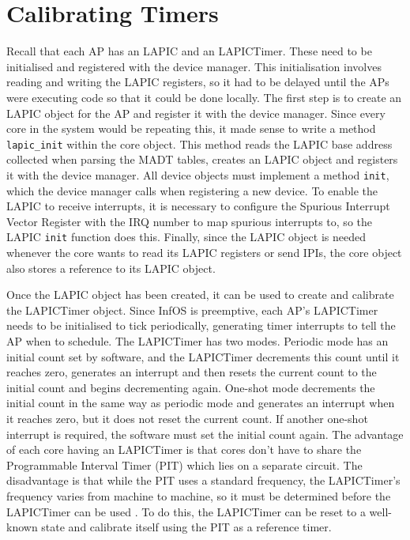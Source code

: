 \documentclass[bsc,frontabs,singlespacing,parskip,deptreport]{infthesis}
\begin{document}
\section{Calibrating Timers} \label{calibrating-timers}
Recall that each AP has an LAPIC and an LAPICTimer. These need to be initialised and registered with the device manager. This initialisation involves reading and writing the LAPIC registers, so it had to be delayed until the APs were executing code so that it could be done locally. The first step is to create an LAPIC object for the AP and register it with the device manager. Since every core in the system would be repeating this, it made sense to write a method \verb|lapic_init| within the core object. This method reads the LAPIC base address collected when parsing the MADT tables, creates an LAPIC object and registers it with the device manager. All device objects must implement a method \verb|init|, which the device manager calls when registering a new device. To enable the LAPIC to receive interrupts, it is necessary to configure the Spurious Interrupt Vector Register with the IRQ number to map spurious interrupts to, so the LAPIC \verb|init| function does this. Finally, since the LAPIC object is needed whenever the core wants to read its LAPIC registers or send IPIs, the core object also stores a reference to its LAPIC object. 

Once the LAPIC object has been created, it can be used to create and calibrate the LAPICTimer object. Since InfOS is preemptive, each AP's LAPICTimer needs to be initialised to tick periodically, generating timer interrupts to tell the AP when to schedule. The LAPICTimer has two modes. Periodic mode has an initial count set by software, and the LAPICTimer decrements this count until it reaches zero, generates an interrupt and then resets the current count to the initial count and begins decrementing again. One-shot mode decrements the initial count in the same way as periodic mode and generates an interrupt when it reaches zero, but it does not reset the current count. If another one-shot interrupt is required, the software must set the initial count again. The advantage of each core having an LAPICTimer is that cores don't have to share the Programmable Interval Timer (PIT) which lies on a separate circuit. The disadvantage is that while the PIT uses a standard frequency, the LAPICTimer's frequency varies from machine to machine, so it must be determined before the LAPICTimer can be used \cite{osdev-apic-timer}. To do this, the LAPICTimer can be reset to a well-known state and calibrate itself using the PIT as a reference timer. 
\end{document}

